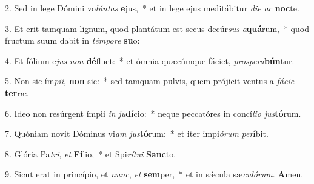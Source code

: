 2. Sed in lege Dómini vo\textit{lún}\textit{tas} \textbf{e}jus,~*  et in lege ejus meditábitur \textit{di}\textit{e} \textit{ac} \textbf{noc}te.\

3. Et erit tamquam lignum, quod plantátum est secus decúr\textit{sus} \textit{a}\textbf{quá}rum,~*  quod fructum suum dabit in \textit{tém}\textit{po}\textit{re} \textbf{su}o:\

4. Et fólium e\textit{jus} \textit{non} \textbf{dé}fluet:~*  et ómnia quæcúmque fáciet, \textit{pro}\textit{spe}\textit{ra}\textbf{bún}tur.\

5. Non sic ím\textit{pi}\textit{i}, \textbf{non} sic:~*  sed tamquam pulvis, quem prójicit ventus a \textit{fá}\textit{ci}\textit{e} \textbf{ter}ræ.\

6. Ideo non resúrgent ímpii \textit{in} \textit{ju}\textbf{dí}cio:~*  neque peccatóres in concí\textit{li}\textit{o} \textit{jus}\textbf{tó}rum.\

7. Quóniam novit Dóminus vi\textit{am} \textit{jus}\textbf{tó}rum:~*  et iter impi\textit{ó}\textit{rum} \textit{per}\textbf{í}bit.\

8. Glória Pa\textit{tri}, \textit{et} \textbf{Fí}lio,~*  et Spi\textit{rí}\textit{tu}\textit{i} \textbf{Sanc}to.\

9. Sicut erat in princípio, et \textit{nunc}, \textit{et} \textbf{sem}per,~*  et in sǽcula sæ\textit{cu}\textit{ló}\textit{rum}. \textbf{A}men.\


